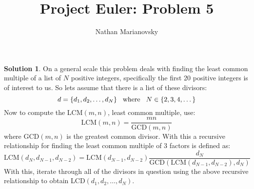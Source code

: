 \documentclass[12pt, letterpaper, onecolumn, conference, final]{IEEEtran}
\title{Project Euler: Problem 5}
\author{Nathan Marianovsky}
\theoremstyle{definition}
\newtheorem*{problem*}{Problem}
\newtheorem*{solution*}{Solution}
\theoremstyle{plain}
\begin{document}
\maketitle

\begin{center}
\end{center}

\vspace{.3cm}
\begin{solution*}
On a general scale this problem deals with finding the least common multiple of a list of $N$ positive integers, specifically the first 20 positive integers is of interest to us. So lets assume that there is a list of these divisors:
\begin{equation*}
d = \{d_1,d_2,\dots,d_N\} \hspace{.3cm} \text{where} \hspace{.3cm} N \in \{2,3,4,\dots\}
\end{equation*}
Now to compute the LCM$(m,n)$, least common multiple, use:
\begin{equation*}
\text{LCM}(m,n) = \frac{mn}{\text{GCD}(m,n)}
\end{equation*}
where GCD$(m,n)$ is the greatest common divisor. With this a recursive relationship for finding the least common multiple of 3 factors is defined as:
\begin{equation*}
\text{LCM}(d_N,d_{N-1},d_{N-2}) = \text{LCM}(d_{N-1},d_{N-2}) \frac{d_N}{\text{GCD}(\text{LCM}(d_{N-1},d_{N-2}),d_N)}
\end{equation*}
With this, iterate through all of the divisors in question using the above recursive relationship to obtain LCD$(d_1,d_2,\dots,d_N)$.
\end{solution*}
\end{document}
